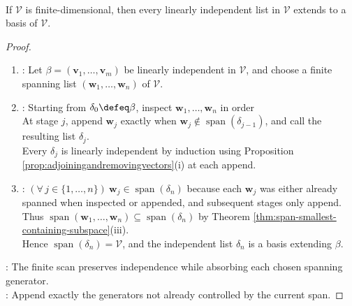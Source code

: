 \begin{theorem} \label{thm:extending-independent-lists} \\
If $\mathcal{V}$ is finite-dimensional, then every linearly independent list in $\mathcal{V}$ extends to a basis of $\mathcal{V}$.
\begin{proof}
\begin{enumerate}[label=(\roman*)]
\setlength{\itemsep}{0pt}
\item {}: Let $\beta=(\mathbf{v}_1,\ldots,\mathbf{v}_m)$ be linearly independent in $\mathcal{V}$, and choose a finite spanning list $(\mathbf{w}_1,\ldots,\mathbf{w}_n)$ of $\mathcal{V}$.
\item {}: Starting from $\delta_0\defeq\beta$, inspect $\mathbf{w}_1,\ldots,\mathbf{w}_n$ in order\\
 At stage $j$, append $\mathbf{w}_j$ exactly when $\mathbf{w}_j\notin\operatorname{span}(\delta_{j-1})$, and call the resulting list $\delta_j$.\\
Every $\delta_j$ is linearly independent by induction using Proposition \ref{prop:adjoiningandremovingvectors}(i) at each append.
\item {}: $(\forall\,j\in\{1,\ldots,n\})\ \mathbf{w}_j\in\operatorname{span}(\delta_n)$ because each $\mathbf{w}_j$ was either already spanned when inspected or appended, and subsequent stages only append. Thus $\operatorname{span}(\mathbf{w}_1,\ldots,\mathbf{w}_n)\subseteq\operatorname{span}(\delta_n)$ by Theorem \ref{thm:span-smallest-containing-subspace}(iii).\\
Hence $\operatorname{span}(\delta_n)=\mathcal{V}$, and the independent list $\delta_n$ is a basis extending $\beta$.
\end{enumerate}
: The finite scan preserves independence while absorbing each chosen spanning generator.\\
: Append exactly the generators not already controlled by the current span.
\end{proof}
\end{theorem}

